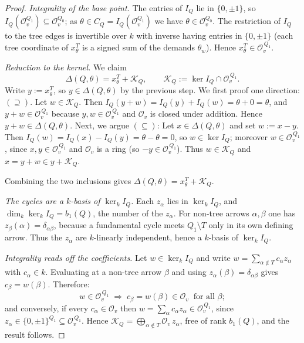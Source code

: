 \documentclass[12pt]{amsart}
\theoremstyle{plain}
\theoremstyle{definition}
\begin{document}
\begin{proof}
\emph{Integrality of the base point.} The entries of $I_Q$ lie in $\{0,\pm 1\}$,
so $I_Q(\mathcal{O}_v^{Q_1}) \subseteq \mathcal{O}_v^{Q_0}$; as
$\theta \in C_Q = I_Q(\mathcal{O}_v^{Q_1})$ we have $\theta \in \mathcal{O}_v^{Q_0}$.
The restriction of $I_Q$ to the tree edges is invertible over $k$ with inverse
having entries in $\{0,\pm 1\}$ (each tree coordinate of $x^T_\theta$ is a signed
sum of the demands $\theta_w$). Hence $x^T_\theta \in \mathcal{O}_v^{\,Q_1}$.


\emph{Reduction to the kernel.} We claim
\[
  \Delta(Q,\theta) = x^T_\theta + \mathcal{K}_Q,
  \qquad \mathcal{K}_Q := \ker I_Q \cap \mathcal{O}_v^{\,Q_1}.
\]
Write $y := x^T_\theta$, so $y \in \Delta(Q,\theta)$ by the previous step.
We first proof one direction: $(\supseteq)$. Let $w \in \mathcal{K}_Q$. Then
$I_Q(y + w) = I_Q(y) + I_Q(w) = \theta + 0 = \theta$, and
$y + w \in \mathcal{O}_v^{\,Q_1}$ because $y, w \in \mathcal{O}_v^{\,Q_1}$ and
$\mathcal{O}_v$ is closed under addition. Hence $y + w \in \Delta(Q,\theta)$.
Next, we argue $(\subseteq)$: Let $x \in \Delta(Q,\theta)$ and set $w := x - y$. Then
$I_Q(w) = I_Q(x) - I_Q(y) = \theta - \theta = 0$, so $w \in \ker I_Q$;
moreover $w \in \mathcal{O}_v^{\,Q_1}$, since $x, y \in \mathcal{O}_v^{\,Q_1}$ and
$\mathcal{O}_v$ is a ring (so $-y \in \mathcal{O}_v^{\,Q_1}$). Thus
$w \in \mathcal{K}_Q$ and $x = y + w \in y + \mathcal{K}_Q$.

Combining the two inclusions gives $\Delta(Q,\theta) = x^T_\theta + \mathcal{K}_Q$.


\emph{The cycles are a $k$-basis of $\ker_k I_Q$.} 
Each $z_\alpha$ lies in
$\ker_k I_Q$, and $\dim_k \ker_k I_Q  = b_1(Q)$, the number of the $z_\alpha$. For non-tree
arrows $\alpha,\beta$ one has $z_\beta(\alpha) = \delta_{\alpha\beta}$, because a
fundamental cycle meets $Q_1 \setminus T$ only in its own defining arrow. Thus
the $z_\alpha$ are $k$-linearly independent, hence a $k$-basis of $\ker_k I_Q$.

\emph{Integrality reads off the coefficients.} Let $w \in \ker_k I_Q$ and write
$w = \sum_{\alpha \notin T} c_\alpha z_\alpha$ with $c_\alpha \in k$. Evaluating at
a non-tree arrow $\beta$ and using $z_\alpha(\beta) = \delta_{\alpha\beta}$ gives
$c_\beta = w(\beta)$. Therefore:
\[
  w \in \mathcal{O}_v^{\,Q_1}
  \;\Longrightarrow\; c_\beta = w(\beta) \in \mathcal{O}_v \ \text{ for all } \beta;
\]
and conversely, if every $c_\alpha \in \mathcal{O}_v$ then
$w = \sum_\alpha c_\alpha z_\alpha \in \mathcal{O}_v^{\,Q_1}$, since
$z_\alpha \in \{0,\pm 1\}^{Q_1} \subseteq \mathcal{O}_v^{\,Q_1}$. Hence
$\mathcal{K}_Q = \bigoplus_{\alpha \notin T} \mathcal{O}_v\, z_\alpha$, free of
rank $b_1(Q)$, and the result follows.
\end{proof}
\end{document}
